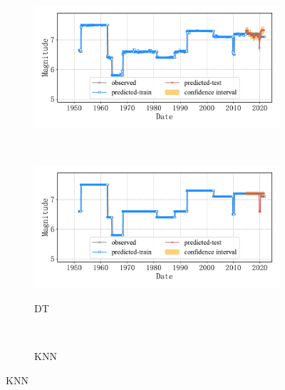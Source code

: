 \begin{figure}[!htbp]
\begin{subfigure}[b]{0.45\textwidth}
    \includegraphics[width=\textwidth]{Img/chap5_seism/split90/seism_gbr_minyear_1932_maxyear_2021_spanlat_2_spanlon_4_timewindow_120_nextmonth_120_minmag_3.0_split_ratio_0.9_blocks1.pdf}
    \vspace{-1cm}
    \label{fig:seism_gbr_minyear_1932_maxyear_2021_spanlat_2_spanlon_4_timewindow_120_nextmonth_120_minmag_3.0_split_ratio_0.9_blocks1}
  \end{subfigure}
  ~
  \begin{subfigure}[b]{0.45\textwidth}
    \caption{DT}
    \vspace{-0.2cm}
    \includegraphics[width=\textwidth]{Img/chap5_seism/split90/seism_dt_minyear_1932_maxyear_2021_spanlat_2_spanlon_4_timewindow_120_nextmonth_120_minmag_3.0_split_ratio_0.9_blocks1.pdf}
    \vspace{-1cm}
    \label{fig:seism_dt_minyear_1932_maxyear_2021_spanlat_2_spanlon_4_timewindow_120_nextmonth_120_minmag_3.0_split_ratio_0.9_blocks1}
  \end{subfigure}
  \\
  \begin{subfigure}[b]{0.45\textwidth}
    \caption{KNN}
    \vspace{-0.2cm}

\end{subfigure}
\end{figure}
